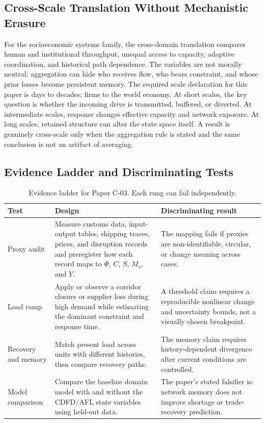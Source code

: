 \documentclass[11pt,a4paper]{article}
\begin{document}
\subsection{Cross-Scale Translation Without Mechanistic Erasure}

For the socioeconomic systems family, the cross-domain translation compares human and institutional throughput, unequal access to capacity, adaptive coordination, and historical path dependence. The variables are not morally neutral: aggregation can hide who receives flow, who bears constraint, and whose prior losses become persistent memory. \cite{BarabasiAlbert1999,WattsStrogatz1998,Holling1973,Shannon1948}
The required scale declaration for this paper is days to decades; firms to the world economy. At short
scales, the key question is whether the incoming drive is transmitted,
buffered, or diverted. At intermediate scales, response changes effective
capacity and network exposure. At long scales, retained structure can alter the
state space itself. A result is genuinely cross-scale only when the aggregation
rule is stated and the same conclusion is not an artifact of averaging.

\subsection{Evidence Ladder and Discriminating Tests}

\begin{table}[htbp]
\centering
\small
\caption{Evidence ladder for Paper C-03. Each rung can fail independently.}
\begin{tabularx}{\textwidth}{|p{}|X|X|}
\hline
\textbf{Test} & \textbf{Design} & \textbf{Discriminating result} \\
\hline
Proxy audit & Measure customs data, input-output tables, shipping traces, prices, and disruption records and preregister how each record maps to $\Phi$, $C$, $S$, $M_s$, and $Y$. & The mapping fails if proxies are non-identifiable, circular, or change meaning across cases. \\
\hline
Load ramp & Apply or observe a corridor closure or supplier loss during high demand while estimating the dominant constraint and response time. & A threshold claim requires a reproducible nonlinear change and uncertainty bounds, not a visually chosen breakpoint. \\
\hline
Recovery and memory & Match present load across units with different histories, then compare recovery paths. & The memory claim requires history-dependent divergence after current conditions are controlled. \\
\hline
Model comparison & Compare the baseline domain model with and without the CDFD/AFL state variables using held-out data. & The paper's stated falsifier is: network memory does not improve shortage or trade-recovery prediction. \\
\hline
\end{tabularx}
\end{table}
\end{document}
